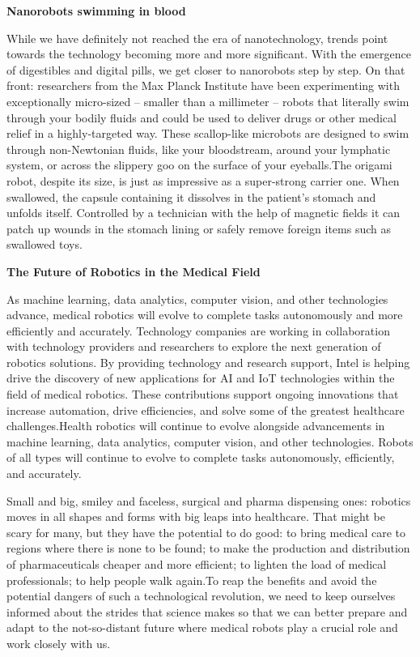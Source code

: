 \documentclass[12pt,a4paper]{report}
\begin{document}
\begin{center}
  \small{\textbf{Nanorobots swimming in blood}}
\end{center}

While we have definitely not reached the era of nanotechnology, trends point towards the technology becoming more and more significant. With the emergence of digestibles and digital pills, we get closer to nanorobots step by step. On that front: researchers from the Max Planck Institute have been experimenting with exceptionally micro-sized – smaller than a millimeter – robots that literally swim through your bodily fluids and could be used to deliver drugs or other medical relief in a highly-targeted way. These scallop-like microbots are designed to swim through non-Newtonian fluids, like your bloodstream, around your lymphatic system, or across the slippery goo on the surface of your eyeballs.The origami robot, despite its size, is just as impressive as a super-strong carrier one. When swallowed, the capsule containing it dissolves in the patient’s stomach and unfolds itself. Controlled by a technician with the help of magnetic fields it can patch up wounds in the stomach lining or safely remove foreign items such as swallowed toys.




\begin{center}
  \huge{\textbf{The Future of Robotics in the Medical Field}}
\end{center}

As machine learning, data analytics, computer vision, and other technologies advance, medical robotics will evolve to complete tasks autonomously and more efficiently and accurately. Technology companies are working in collaboration with technology providers and researchers to explore the next generation of robotics solutions. By providing technology and research support, Intel is helping drive the discovery of new applications for AI and IoT technologies within the field of medical robotics. These contributions support ongoing innovations that increase automation, drive efficiencies, and solve some of the greatest healthcare challenges.Health robotics will continue to evolve alongside advancements in machine learning, data analytics, computer vision, and other technologies. Robots of all types will continue to evolve to complete tasks autonomously, efficiently, and accurately.\par


Small and big, smiley and faceless, surgical and pharma dispensing ones: robotics moves in all shapes and forms with big leaps into healthcare. That might be scary for many, but they have the potential to do good: to bring medical care to regions where there is none to be found; to make the production and distribution of pharmaceuticals cheaper and more efficient; to lighten the load of medical professionals; to help people walk again.To reap the benefits and avoid the potential dangers of such a technological revolution, we need to keep ourselves informed about the strides that science makes so that we can better prepare and adapt to the not-so-distant future where medical robots play a crucial role and work closely with us.\par
\end{document}
